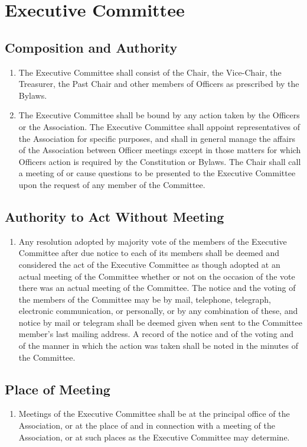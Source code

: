 \documentclass[12pt,letterpaper]{article}
\begin{document}
\section{Executive Committee}

\subsection{Composition and Authority}
\begin{enumerate}
	\item The Executive Committee shall consist of the Chair, the Vice-Chair, the
				Treasurer, the Past Chair and other members of Officers as prescribed by the
				Bylaws.
	\item The Executive Committee shall be bound by any action taken by the Officers or
				the Association. The Executive Committee shall appoint representatives of the
				Association for specific purposes, and shall in general manage the affairs of
				the Association between Officer meetings except in those matters for which
				Officers action is required by the Constitution or Bylaws. The Chair shall
				call a meeting of or cause questions to be presented to the Executive
				Committee upon the request of any member of the Committee.
\end{enumerate}

\subsection{Authority to Act Without Meeting}
\begin{enumerate}
	\item Any resolution adopted by majority vote of the members of the Executive
				Committee after due notice to each of its members shall be deemed and
				considered the act of the Executive Committee as though adopted at an actual
				meeting of the Committee whether or not on the occasion of the vote there was
				an actual meeting of the Committee. The notice and the voting of the members
				of the Committee may be by mail, telephone, telegraph, electronic
				communication, or personally, or by any combination of these, and notice by
				mail or telegram shall be deemed given when sent to the Committee member's
				last mailing address. A record of the notice and of the voting and of the
				manner in which the action was taken shall be noted in the minutes of the
				Committee.
\end{enumerate}

\subsection{Place of Meeting}
\begin{enumerate}
	\item Meetings of the Executive Committee shall be at the principal office of the
				Association, or at the place of and in connection with a meeting of the
				Association, or at such places as the Executive Committee may determine.
\end{enumerate}
\end{document}
